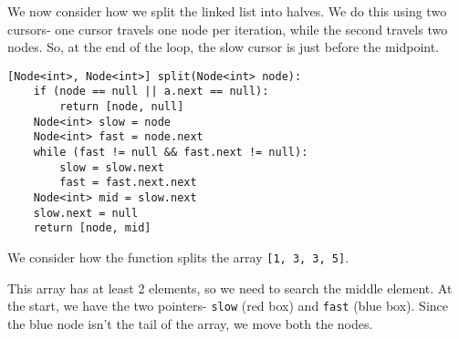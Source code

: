 \documentclass[a4paper, openany]{memoir}
\begin{document}
\noindent We now consider how we split the linked list into halves. We do this using two cursors- one cursor travels one node per iteration, while the second travels two nodes. So, at the end of the loop, the slow cursor is just before the midpoint.
\begin{lstlisting}[language=pseudocode]
[Node<int>, Node<int>] split(Node<int> node):
    if (node == null || a.next == null):
        return [node, null]
    Node<int> slow = node
    Node<int> fast = node.next
    while (fast != null && fast.next != null):
        slow = slow.next
        fast = fast.next.next
    Node<int> mid = slow.next
    slow.next = null
    return [node, mid]
\end{lstlisting}
We consider how the function splits the array \texttt{[1, 3, 3, 5]}.
\begin{center}
\end{center}
This array has at least 2 elements, so we need to search the middle element. At the start, we have the two pointers- \texttt{slow} (red box) and \texttt{fast} (blue box). Since the blue node isn't the tail of the array, we move both the nodes.
\begin{center}
\end{center}
\end{document}
